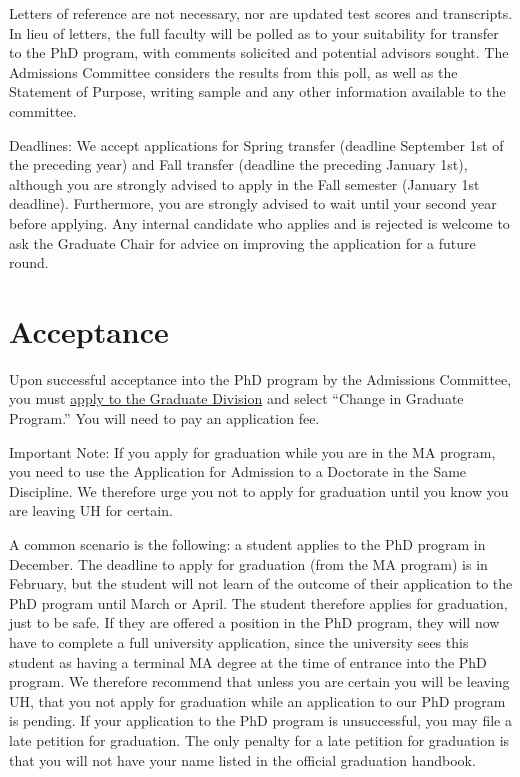 \documentclass[
]{book}
\begin{document}
Letters of reference are not necessary, nor are updated test scores and transcripts. In lieu of letters, the full faculty will be polled as to your suitability for transfer to the PhD program, with comments solicited and potential advisors sought. The Admissions Committee considers the results from this poll, as well as the Statement of Purpose, writing sample and any other information available to the committee.

Deadlines: We accept applications for Spring transfer (deadline September 1st of the preceding year) and Fall transfer (deadline the preceding January 1st), although you are strongly advised to apply in the Fall semester (January 1st deadline). Furthermore, you are strongly advised to wait until your second year before applying. Any internal candidate who applies and is rejected is welcome to ask the Graduate Chair for advice on improving the application for a future round.

\hypertarget{acceptance}{%
\section{Acceptance}\label{acceptance}}

Upon successful acceptance into the PhD program by the Admissions Committee, you must \href{http://www.apply.hawaii.edu}{apply to the Graduate Division} and select ``Change in Graduate Program.'' You will need to pay an application fee.

Important Note: If you apply for graduation while you are in the MA program, you need to use the Application for Admission to a Doctorate in the Same Discipline. We therefore urge you not to apply for graduation until you know you are leaving UH for certain.

A common scenario is the following: a student applies to the PhD program in December. The deadline to apply for graduation (from the MA program) is in February, but the student will not learn of the outcome of their application to the PhD program until March or April. The student therefore applies for graduation, just to be safe. If they are offered a position in the PhD program, they will now have to complete a full university application, since the university sees this student as having a terminal MA degree at the time of entrance into the PhD program. We therefore recommend that unless you are certain you will be leaving UH, that you not apply for graduation while an application to our PhD program is pending. If your application to the PhD program is unsuccessful, you may file a late petition for graduation. The only penalty for a late petition for graduation is that you will not have your name listed in the official graduation handbook.
\end{document}
